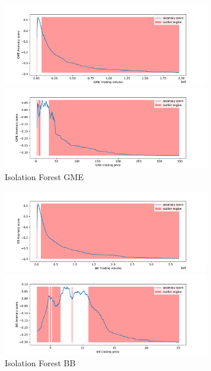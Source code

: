 \documentclass[12pt,twoside]{report}
\begin{document}
\begin{figure}[H]
\begin{multicols}{2}
    \includegraphics[width=9cm]{../code/figures/if_trading_GME.pdf}\par 
    \includegraphics[width=9cm]{../code/figures/if_closing_GME.pdf}\par 
\end{multicols}
\caption{Isolation Forest GME}
\label{fig:if-GME}
\end{figure}

\begin{figure}[H]
\begin{multicols}{2}
    \includegraphics[width=9cm]{../code/figures/if_trading_BB.pdf}\par 
    \includegraphics[width=9cm]{../code/figures/if_closing_BB.pdf}\par 
\end{multicols}
\caption{Isolation Forest BB}
\end{figure}
\end{document}
